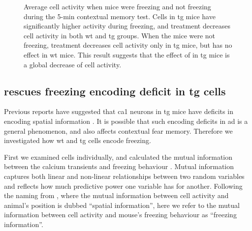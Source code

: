\begin{figure}[h]
    \begin{subfigure}[h]{\textwidth}
        
        \caption{\label{f.ad.actf}}
    \end{subfigure}
    \begin{subfigure}[h]{\textwidth}
        
        \caption{\label{f.ad.actnf}}
    \end{subfigure}
    \caption[Cell activity during freezing.]{Average cell activity when mice were  freezing and  not freezing during the 5-min contextual memory test. Cells in \gls{tg} mice have significantly higher activity during freezing, and \tglu{} treatment decreases cell activity in both \gls{wt} and \gls{tg} groups. When the mice were not freezing, \tglu{} treatment decreases cell activity only in \gls{tg} mice, but has no effect in \gls{wt} mice. This result suggests that the effect of \tglu{} in \gls{tg} mice is a global decrease of cell activity. \label{f.ad.activity_freezing}}
\end{figure}

\subsection{\tglu{} rescues freezing encoding deficit in \gls{tg} cells}

Previous reports have suggested that \gls{ca1} neurons in \gls{tg} mice have deficits in encoding spatial information \citep{cheng13}. It is possible that such encoding deficits in \gls{ad} is a general phenomenon, and also affects contextual fear memory. Therefore we investigated how \gls{wt} and \gls{tg} cells encode freezing. 

First we examined cells individually, and calculated the mutual information between the calcium transients and freezing behaviour \citep{victor02,ross14}. Mutual information captures both linear and non-linear relationships between two random variables and reflects how much predictive power one variable has for another. Following the naming from \citet{skaggs93}, where the mutual information between cell activity and animal's position is dubbed ``spatial information'', here we refer to the mutual information between cell activity and mouse's freezing behaviour as ``freezing information''. 

